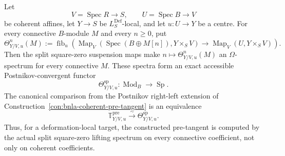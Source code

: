 \begin{proposition}
\label{prop:bnla-pre-tangent-def-evaluation}
Let
\[
    V=\operatorname{Spec}R\longrightarrow S,
    \qquad
    U=\operatorname{Spec}B\longrightarrow V
\]
be coherent affines, let $Y\to S$ be $L^{\mathrm{Def}}_S$-local, and let
$u:U\to Y$ be a centre.  For every connective $B$-module $M$ and every
$n\geq0$, put
\[
\Theta^n_{Y/V,u}(M)
:=
\operatorname{fib}_{u}
\left(
    \operatorname{Map}_V
    \left(
        \operatorname{Spec}(B\oplus M[n]),
        Y\times_SV
    \right)
    \longrightarrow
    \operatorname{Map}_V(U,Y\times_SV)
\right).
\]
Then the split square-zero suspension maps make
$n\mapsto\Theta^n_{Y/V,u}(M)$ an $\Omega$-spectrum for every connective
$M$.  These spectra form an exact accessible Postnikov-convergent functor
\[
    \Theta^{\mathrm{sp}}_{Y/V,u}:
    \operatorname{Mod}_B
    \longrightarrow
    \operatorname{Sp}.
\]
The canonical comparison from the Postnikov right-left extension of
Construction~\ref{con:bnla-coherent-pre-tangent} is an equivalence
\[
\boxed{
    \mathbb T^{\mathrm{pre}}_{Y/V,u}
    \xrightarrow{\sim}
    \Theta^{\mathrm{sp}}_{Y/V,u}.}
\]
Thus, for a deformation-local target, the constructed pre-tangent is computed
by the actual split square-zero lifting spectrum on every connective
coefficient, not only on coherent coefficients.
\end{proposition}

